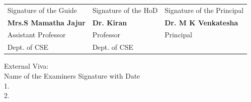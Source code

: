 \vspace{1 cm}
\begin{center}

\begin{table}[ht]
\centering
\begin{tabular}{p{5.5cm} p{5.5cm} p{5.5cm} }
Signature of the Guide & Signature of the HoD & Signature of the Principal \\
\textbf{Mrs.S Mamatha Jajur} & \textbf{Dr. Kiran}  & \textbf{Dr. M K Venkatesha}\\
Assistant Professor & Professor & Principal \\ 
Dept. of CSE  & Dept. of CSE & \\ 
\end{tabular}

\end{table} 

\end{center}

\vspace{0.5cm}
\begin{flushleft}
External Viva:\\
Name of the Examiners         \hspace{5cm}          Signature with Date  \\
1.  \\
2. \\ 
			
\end{flushleft}
\thispagestyle{empty}




